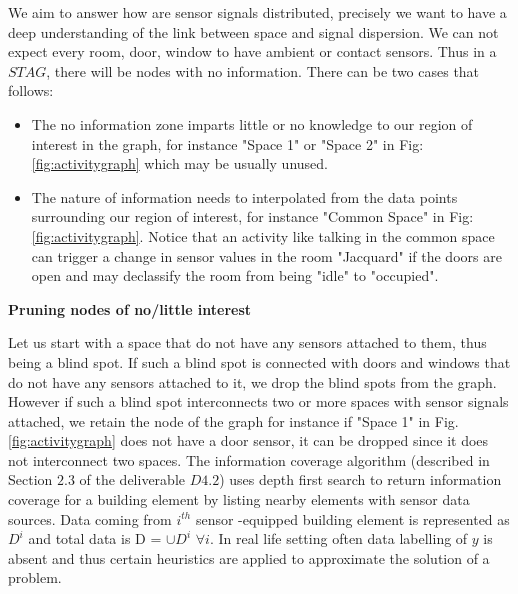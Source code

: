 We aim to answer how are sensor signals distributed, precisely we want to have a deep understanding of the link between space and signal dispersion. We can not expect every room, door, window to have ambient or contact sensors. Thus in a $STAG$, there will be nodes with no information. There can be two cases that follows:

\begin{itemize}
\item  The no information zone imparts little or no knowledge to our region of interest in the graph, for instance "Space 1" or "Space 2" in Fig: \ref{fig:activitygraph} which may be usually unused.
\item The nature of information needs to interpolated from the data points surrounding our region of interest, for instance "Common Space" in Fig: \ref{fig:activitygraph}. Notice that an activity like talking in the common space can trigger a change in sensor values in the room "Jacquard" if the doors are open and may declassify the room from being "idle" to "occupied". 
\end{itemize}

\textbf{Pruning nodes of no/little interest}


Let us start with a space that do not have any sensors attached to them, thus being a blind spot. If such a blind spot is connected with doors and windows that do not have any sensors attached to it, we drop the blind spots from the graph. However if such a blind spot interconnects two or more spaces with sensor signals attached, we retain the node of the graph for instance if "Space 1" in Fig. \ref{fig:activitygraph} does not have a door sensor, it can be dropped since it does not interconnect two spaces. The information coverage algorithm (described in Section $2.3$ of the deliverable $D4.2$) uses depth first search to return information coverage for a building element by listing nearby elements with sensor data sources. Data coming from $i^{th}$ sensor -equipped building element is represented as $D^i$ and total data is D = $\cup D^i $ $\forall i$. In real life setting often data labelling of $y$ is absent and thus certain heuristics are applied to approximate the solution of a problem. 
 

